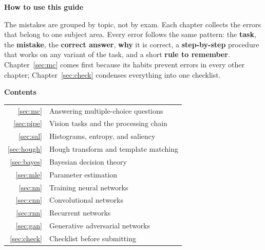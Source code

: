\documentclass[11pt,a4paper]{article}
\newcommand{\keep}[1]{\par
  \ifdim\dimexpr\pagegoal-\pagetotal\relax<#1\relax\newpage\fi}
\newcommand{\sub}[1]{\keep{6cm}\medskip
  {\sffamily\bfseries\large\color{accent}#1}\par\smallskip}
\begin{document}
\thispagestyle{empty}
\vspace*{4.2cm}

\sub{How to use this guide}
The mistakes are grouped by topic, not by exam. Each chapter collects the errors
that belong to one subject area. Every error follows the same pattern: the
\textcolor{questc}{\textbf{task}}, the \textcolor{wrongc}{\textbf{mistake}}, the
\textcolor{rightc}{\textbf{correct answer}}, \textcolor{whyc}{\textbf{why}} it is
correct, a \textcolor{stepc}{\textbf{step-by-step}} procedure that works on any
variant of the task, and a short \textcolor{hookc}{\textbf{rule to remember}}.
Chapter~\ref{sec:mc} comes first because its habits prevent errors in every
other chapter; Chapter~\ref{sec:check} condenses everything into one checklist.

\sub{Contents}
\begin{center}
\begin{tabularx}{\linewidth}{@{}r>{\raggedright\arraybackslash}X@{}}
  \ref{sec:mc} & Answering multiple-choice questions \\
  \ref{sec:pipe} & Vision tasks and the processing chain \\
  \ref{sec:sal} & Histograms, entropy, and saliency \\
  \ref{sec:hough} & Hough transform and template matching \\
  \ref{sec:bayes} & Bayesian decision theory \\
  \ref{sec:mle} & Parameter estimation \\
  \ref{sec:nn} & Training neural networks \\
  \ref{sec:cnn} & Convolutional networks \\
  \ref{sec:rnn} & Recurrent networks \\
  \ref{sec:gan} & Generative adversarial networks \\
  \ref{sec:check} & Checklist before submitting \\
\end{tabularx}
\end{center}
\end{document}

